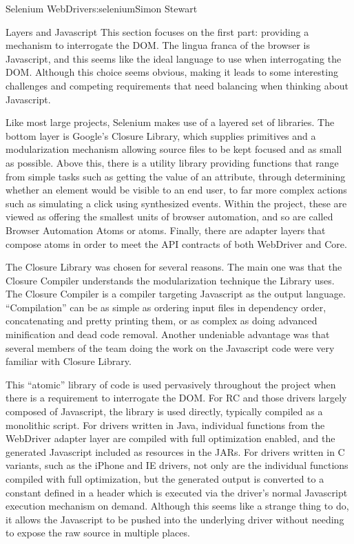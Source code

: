 \begin{aosachapter}{Selenium WebDriver}{s:selenium}{Simon Stewart}
\begin{aosasect1}{Layers and Javascript}
This section focuses on the first part: providing a mechanism to
interrogate the DOM\@. The lingua franca of the browser is Javascript,
and this seems like the ideal language to use when interrogating the
DOM\@. Although this choice seems obvious, making it leads to some
interesting challenges and competing requirements that need balancing
when thinking about Javascript.

Like most large projects, Selenium makes use of a layered set of
libraries.  The bottom layer is Google's Closure Library, which
supplies primitives and a modularization mechanism allowing source
files to be kept focused and as small as possible. Above this, there
is a utility library providing functions that range from simple tasks
such as getting the value of an attribute, through determining whether
an element would be visible to an end user, to far more complex
actions such as simulating a click using synthesized events. Within
the project, these are viewed as offering the smallest units of
browser automation, and so are called Browser Automation Atoms or
atoms. Finally, there are adapter layers that compose atoms in order
to meet the API contracts of both WebDriver and Core.


The Closure Library was chosen for several reasons. The main one was
that the Closure Compiler understands the modularization technique the
Library uses. The Closure Compiler is a compiler targeting Javascript
as the output language. ``Compilation'' can be as simple as ordering
input files in dependency order, concatenating and pretty printing
them, or as complex as doing advanced minification and dead code
removal. Another undeniable advantage was that several members of the
team doing the work on the Javascript code were very familiar with
Closure Library.

This ``atomic'' library of code is used pervasively throughout the
project when there is a requirement to interrogate the DOM\@.  For RC
and those drivers largely composed of Javascript, the library is used
directly, typically compiled as a monolithic script. For drivers
written in Java, individual functions from the WebDriver adapter layer
are compiled with full optimization enabled, and the generated
Javascript included as resources in the JARs. For drivers written in C
variants, such as the iPhone and IE drivers, not only are the
individual functions compiled with full optimization, but the
generated output is converted to a constant defined in a header which
is executed via the driver's normal Javascript execution mechanism on
demand. Although this seems like a strange thing to do, it allows the
Javascript to be pushed into the underlying driver without needing to
expose the raw source in multiple places.


\end{aosasect1}
\end{aosachapter}
